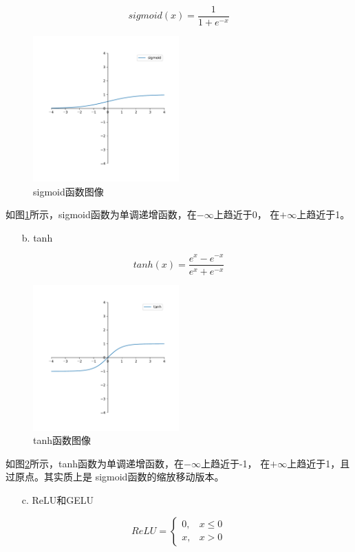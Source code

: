 \documentclass[AutoFakeBold]{LZUThesis}
\begin{document}
$$sigmoid(x)=\frac{1}{1+e^{-x}}$$
\begin{figure}[H]
	\centering
    \includegraphics[width=0.5\textwidth]{figures/sigmoid.pdf}
    \caption{sigmoid函数图像}
    \label{fig_sigmoid}
\end{figure}
如图\ref{fig_sigmoid}所示，sigmoid函数为单调递增函数，在$-\infty$上趋近于0，
在$+\infty$上趋近于1。

\begin{itemize}
    \item[b. ] tanh
\end{itemize}

$$tanh(x) = \frac{e^x-e^{-x}}{e^x+e^{-x}}$$
\begin{figure}[H]
	\centering
    \includegraphics[width=0.5\textwidth]{figures/tanh.pdf}
    \caption{tanh函数图像}
    \label{fig_tanh}
\end{figure}
如图\ref{fig_tanh}所示，tanh函数为单调递增函数，在$-\infty$上趋近于-1，
在$+\infty$上趋近于1，且过原点。其实质上是
sigmoid函数的缩放移动版本。

\begin{itemize}
\item[c. ] ReLU和GELU
\end{itemize}

$$
ReLU=
\left\{\begin{matrix}
    0, & x \leq 0 \\
    x, & x > 0
\end{matrix}\right.
$$
\end{document}
